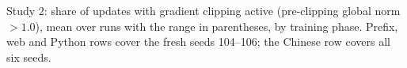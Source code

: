 \documentclass[11pt]{article}
\begin{document}
\begin{table}[H]
\centering
\small
\caption{Study 2: share of updates with gradient clipping active (pre-clipping global norm $> 1.0$), mean over runs
with the range in parentheses, by training phase. Prefix, web and Python rows cover the fresh seeds 104--106; the
Chinese row covers all six seeds.}

\end{table}
\end{document}
